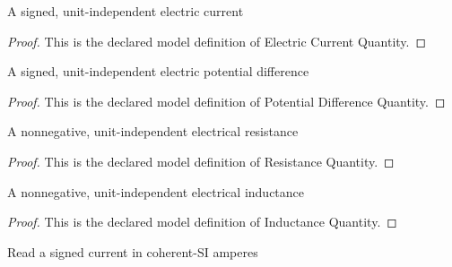\begin{definition}
  \label{def:physics:phyx-mini-0882:phyxminiproblems-problemphyxmini0882-electriccurrentquantity}
  A signed, unit-independent electric current
\end{definition}
\begin{proof}
  This is the declared model definition of Electric Current Quantity.
\end{proof}
\begin{definition}
  \label{def:physics:phyx-mini-0882:phyxminiproblems-problemphyxmini0882-potentialdifferencequantity}
  A signed, unit-independent electric potential difference
\end{definition}
\begin{proof}
  This is the declared model definition of Potential Difference Quantity.
\end{proof}
\begin{definition}
  \label{def:physics:phyx-mini-0882:phyxminiproblems-problemphyxmini0882-resistancequantity}
  A nonnegative, unit-independent electrical resistance
\end{definition}
\begin{proof}
  This is the declared model definition of Resistance Quantity.
\end{proof}
\begin{definition}
  \label{def:physics:phyx-mini-0882:phyxminiproblems-problemphyxmini0882-inductancequantity}
  A nonnegative, unit-independent electrical inductance
\end{definition}
\begin{proof}
  This is the declared model definition of Inductance Quantity.
\end{proof}
\begin{definition}
  \label{def:physics:phyx-mini-0882:phyxminiproblems-problemphyxmini0882-currentinamperes}
  Read a signed current in coherent-SI amperes
\end{definition}

